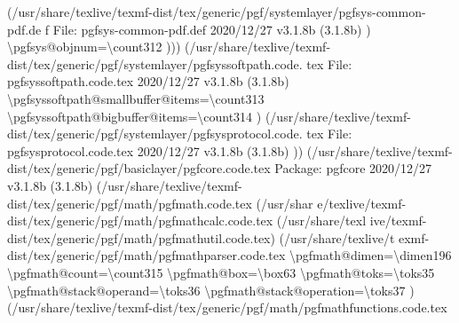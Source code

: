 \documentclass[
  letterpaper,
  DIV=11,
  numbers=noendperiod]{scrartcl}
\newenvironment{Shaded}{\begin{snugshade}}{\end{snugshade}}
\newcommand{\NormalTok}[1]{\textcolor[rgb]{0.00,0.23,0.31}{#1}}
\begin{document}
\begin{Shaded}
\begin{Highlighting}[]
\NormalTok{(/usr/share/texlive/texmf{-}dist/tex/generic/pgf/systemlayer/pgfsys{-}common{-}pdf.de}
\NormalTok{f}
\NormalTok{File: pgfsys{-}common{-}pdf.def 2020/12/27 v3.1.8b (3.1.8b)}
\NormalTok{)}
\NormalTok{\textbackslash{}pgfsys@objnum=\textbackslash{}count312}
\NormalTok{)))}
\NormalTok{(/usr/share/texlive/texmf{-}dist/tex/generic/pgf/systemlayer/pgfsyssoftpath.code.}
\NormalTok{tex}
\NormalTok{File: pgfsyssoftpath.code.tex 2020/12/27 v3.1.8b (3.1.8b)}
\NormalTok{\textbackslash{}pgfsyssoftpath@smallbuffer@items=\textbackslash{}count313}
\NormalTok{\textbackslash{}pgfsyssoftpath@bigbuffer@items=\textbackslash{}count314}
\NormalTok{)}
\NormalTok{(/usr/share/texlive/texmf{-}dist/tex/generic/pgf/systemlayer/pgfsysprotocol.code.}
\NormalTok{tex}
\NormalTok{File: pgfsysprotocol.code.tex 2020/12/27 v3.1.8b (3.1.8b)}
\NormalTok{)) (/usr/share/texlive/texmf{-}dist/tex/generic/pgf/basiclayer/pgfcore.code.tex}
\NormalTok{Package: pgfcore 2020/12/27 v3.1.8b (3.1.8b)}
\NormalTok{(/usr/share/texlive/texmf{-}dist/tex/generic/pgf/math/pgfmath.code.tex (/usr/shar}
\NormalTok{e/texlive/texmf{-}dist/tex/generic/pgf/math/pgfmathcalc.code.tex (/usr/share/texl}
\NormalTok{ive/texmf{-}dist/tex/generic/pgf/math/pgfmathutil.code.tex) (/usr/share/texlive/t}
\NormalTok{exmf{-}dist/tex/generic/pgf/math/pgfmathparser.code.tex}
\NormalTok{\textbackslash{}pgfmath@dimen=\textbackslash{}dimen196}
\NormalTok{\textbackslash{}pgfmath@count=\textbackslash{}count315}
\NormalTok{\textbackslash{}pgfmath@box=\textbackslash{}box63}
\NormalTok{\textbackslash{}pgfmath@toks=\textbackslash{}toks35}
\NormalTok{\textbackslash{}pgfmath@stack@operand=\textbackslash{}toks36}
\NormalTok{\textbackslash{}pgfmath@stack@operation=\textbackslash{}toks37}
\NormalTok{) (/usr/share/texlive/texmf{-}dist/tex/generic/pgf/math/pgfmathfunctions.code.tex}


\end{Highlighting}
\end{Shaded}
\end{document}
